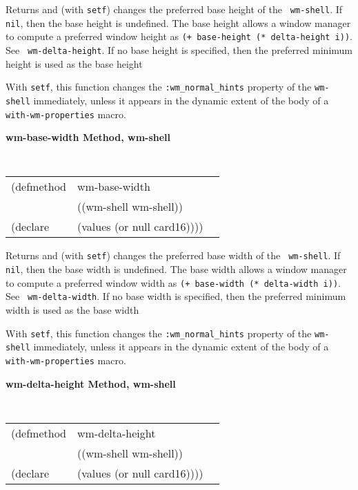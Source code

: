\documentclass[twoside]{book}
\begin{document}
\begin{sloppy}
{\begin{flushright}
{}\end{flushright}}

\begin{flushright} \parbox[t]{6.125in}{
Returns and (with {\tt setf}) changes the preferred base height of the {\tt
wm-shell}.
If {\tt nil}, then the base height is undefined. The base height allows a window manager
to compute
a preferred window height as {\tt (+ base-height (* delta-height i))}. See {\tt
wm-delta-height}.
If no base height is specified, then the preferred minimum height is used as the
base height

With {\tt setf}, this function changes the {\tt :wm\_normal\_hints} property of
the {\tt wm-shell} immediately, unless it appears in the dynamic extent of the
body of a {\tt with-wm-properties} macro.

 }\end{flushright}

{\samepage
{\large {\bf wm-base-width \hfill Method, wm-shell}}
\begin{flushright} \parbox[t]{6.125in}{
\tt
\begin{tabular}{lll}
\raggedright
(defmethod & wm-base-width & \\
           & ((wm-shell  wm-shell)) \\
(declare   & (values (or null card16))))
\end{tabular}
\rm

}\end{flushright}}

\begin{flushright} \parbox[t]{6.125in}{
Returns and (with {\tt setf}) changes the preferred base width of the {\tt
wm-shell}. If {\tt nil}, then the base width is undefined. The base width allows a window
manager to compute a preferred window
width as {\tt (+ base-width (* delta-width i))}. See {\tt
wm-delta-width}.
If no base width is specified, then the preferred minimum width is used as the
base width

With {\tt setf}, this function changes the {\tt :wm\_normal\_hints} property of
the {\tt wm-shell} immediately, unless it appears in the dynamic extent of the
body of a {\tt with-wm-properties} macro.

}\end{flushright}

{\samepage
{\large {\bf wm-delta-height \hfill Method, wm-shell}}
\begin{flushright} \parbox[t]{6.125in}{
\tt
\begin{tabular}{lll}
\raggedright
(defmethod & wm-delta-height & \\
           & ((wm-shell  wm-shell)) \\
(declare   & (values (or null card16))))
\end{tabular}
\rm

}
\end{flushright}}
\end{sloppy}
\end{document}
